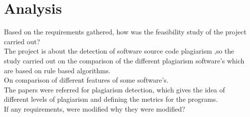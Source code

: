 \section{Analysis}

Based on the requirements gathered, how was the feasibility study of the project carried out? \\
The project is about the detection of software source code plagiarism ,so the study carried out on the comparison of the different plagiarism software's which are based on rule based algorithms.\\
On comparison of different features of some software's.\\
The papers were referred for plagiarism detection, which gives the idea of different levels of plagiarism and defining the metrics for the programs.  \\
If any requirements, were modified why they were modified? \\

